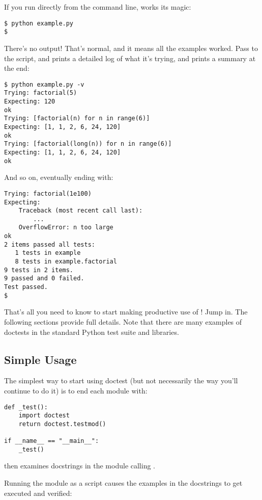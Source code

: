 If you run  directly from the command line,
 works its magic:

\begin{verbatim}
$ python example.py
$
\end{verbatim}

There's no output!  That's normal, and it means all the examples
worked.  Pass  to the script, and 
prints a detailed log of what it's trying, and prints a summary at the
end:

\begin{verbatim}
$ python example.py -v
Trying: factorial(5)
Expecting: 120
ok
Trying: [factorial(n) for n in range(6)]
Expecting: [1, 1, 2, 6, 24, 120]
ok
Trying: [factorial(long(n)) for n in range(6)]
Expecting: [1, 1, 2, 6, 24, 120]
ok
\end{verbatim}

And so on, eventually ending with:

\begin{verbatim}
Trying: factorial(1e100)
Expecting:
    Traceback (most recent call last):
        ...
    OverflowError: n too large
ok
2 items passed all tests:
   1 tests in example
   8 tests in example.factorial
9 tests in 2 items.
9 passed and 0 failed.
Test passed.
$
\end{verbatim}

That's all you need to know to start making productive use of
!  Jump in.  The following sections provide full
details.  Note that there are many examples of doctests in
the standard Python test suite and libraries.

\subsection{Simple Usage}

The simplest way to start using doctest (but not necessarily the way
you'll continue to do it) is to end each module  with:

\begin{verbatim}
def _test():
    import doctest
    return doctest.testmod()

if __name__ == "__main__":
    _test()
\end{verbatim}

 then examines docstrings in the module calling
.

Running the module as a script causes the examples in the docstrings
to get executed and verified:

